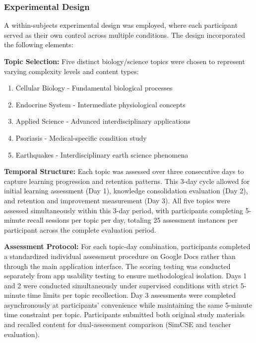 {\subsubsection{Experimental Design}

A within-subjects experimental design was employed, where each participant served as their own control across multiple conditions. The design incorporated the following elements:

\textbf{Topic Selection:} Five distinct biology/science topics were chosen to represent varying complexity levels and content types:
\begin{enumerate}
    \item Cellular Biology - Fundamental biological processes
    \item Endocrine System - Intermediate physiological concepts  
    \item Applied Science - Advanced interdisciplinary applications
    \item Psoriasis - Medical-specific condition study
    \item Earthquakes - Interdisciplinary earth science phenomena
\end{enumerate}

{\color{maroon}
\textbf{Temporal Structure:} Each topic was assessed over three consecutive days to capture learning progression and retention patterns. This 3-day cycle allowed for initial learning assessment (Day 1), knowledge consolidation evaluation (Day 2), and retention and improvement measurement (Day 3). All five topics were assessed simultaneously within this 3-day period, with participants completing 5-minute recall sessions per topic per day, totaling 25 assessment instances per participant across the complete evaluation period.
}

{\color{maroon}
{\color{maroon}
\textbf{Assessment Protocol:} For each topic-day combination, participants completed a standardized individual assessment procedure on Google Docs rather than through the main application interface. The scoring testing was conducted separately from app usability testing to ensure methodological isolation. Days 1 and 2 were conducted simultaneously under supervised conditions with strict 5-minute time limits per topic recollection. Day 3 assessments were completed asynchronously at participants' convenience while maintaining the same 5-minute time constraint per topic. Participants submitted both original study materials and recalled content for dual-assessment comparison (SimCSE and teacher evaluation).
}
}

}
